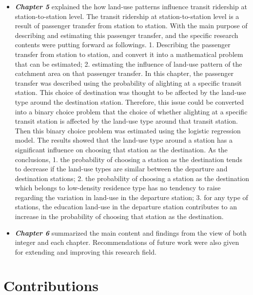 \begin{itemize}
	\item \emph{\textbf{Chapter 5}} explained the how land-use patterns influence transit ridership at station-to-station level. The transit ridership at station-to-station level is a result of passenger transfer from station to station. With the main purpose of describing and estimating this passenger transfer, and the specific research contents were putting forward as followings. 1. Describing the passenger transfer from station to station, and convert it into a mathematical problem that can be estimated; 2. estimating the influence of land-use pattern of the catchment area on that passenger transfer. In this chapter, the passenger transfer was described using the probability of alighting at a specific transit station. This choice of destination was thought to be affected by the land-use type around the destination station. Therefore, this issue could be converted into a binary choice problem that the choice of whether alighting at a specific transit station is affected by the land-use type around that transit station. Then this binary choice problem was estimated using the logistic regression model. The results showed that the land-use type around a station has a significant influence on choosing that station as the destination. As the conclusions, 1. the probability of choosing a station as the destination tends to decrease if the land-use types are similar between the departure and destination stations; 2. the probability of choosing a station as the destination which belongs to low-density residence type has no tendency to raise regarding the variation in land-use in the departure station; 3. for any type of stations, the education land-use in the departure station contributes to an increase in the probability of choosing that station as the destination.
	
	\item \emph{\textbf{Chapter 6}} summarized the main content and findings from the view of both integer and each chapter. Recommendations of future work were also given for extending and improving this research field.
\end{itemize}

\section{Contributions}

